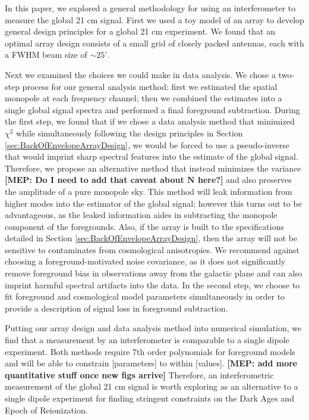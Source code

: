 \documentclass[twolcolumn,apj,iop,numberedappendix]{emulateapj}
\newcommand{\N}{\mathbf{N}}
\newcommand{\mep}[1]{{\color{applegreen} \textbf{[MEP:  #1]}}}
\begin{document}
In this paper, we explored a general methodology for using an interferometer to measure the global 21 cm signal. First we used a toy model of an array to develop general design principles for a global 21 cm experiment. We found that an optimal array design consists of a small grid of closely packed antennas, each with a FWHM beam size of $\sim25^\circ$. 

Next we examined the choices we could make in data analysis. We chose a two-step process for our general analysis method: first we estimated the spatial monopole at each frequency channel; then we combined the estimates into a single global signal spectra and performed a final foreground subtraction. During the first step, we found that if we chose a data analysis method that minimized $\chi^2$ while simultaneously following the design principles in Section \ref{sec:BackOfEnvelopeArrayDesign}, we would be forced to use a pseudo-inverse that would imprint sharp spectral features into the estimate of the global signal. Therefore, we propose an alternative method that instead minimizes the variance \mep{Do I need to add that caveat about $\N$ here?} and also preserves the amplitude of a pure monopole sky. This method will leak information from higher modes into the estimator of the global signal; however this turns out to be advantageous, as the leaked information aides in subtracting the monopole component of the foregrounds. Also, if the array is built to the specifications detailed in Section \ref{sec:BackOfEnvelopeArrayDesign}, then the array will not be sensitive to contaminates from cosmological anisotropies. We recommend against choosing a foreground-motivated noise covariance, as it does not significantly remove foreground bias in observations away from the galactic plane and can also imprint harmful spectral artifacts into the data. In the second step, we choose to fit foreground and cosmological model parameters simultaneously in order to provide a description of signal loss in foreground subtraction. 

Putting our array design and data analysis method into numerical simulation, we find that a measurement by an interferometer is comparable to a single dipole experiment. Both methods require 7th order polynomials for foreground models and will be able to constrain [parameters] to within [values]. \mep{add more quantitative stuff once new figs arrive} Therefore, an interferometric measurement of the global 21 cm signal is worth exploring as an alternative to a single dipole experiment for finding stringent constraints on the Dark Ages and Epoch of Reionization. 
\end{document}
